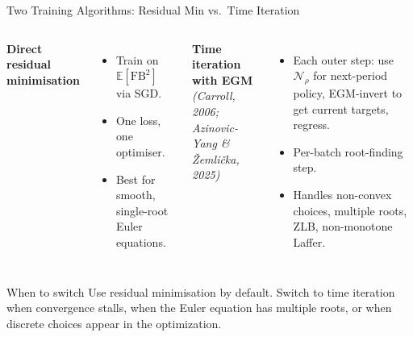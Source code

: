 \documentclass[aspectratio=169,11pt]{beamer}
\newcommand{\emphc}[1]{\textcolor{harvardcrimson}{#1}}
\begin{document}
\begin{frame}{Two Training Algorithms: Residual Min vs.\ Time Iteration}
\small
\begin{columns}[T]
\textbf{Direct residual minimisation}
\begin{itemize}\itemsep2pt
    \item Train on $\mathbb{E}[\mathrm{FB}^2]$ via SGD.
    \item One loss, one optimiser.
    \item Best for smooth, single-root Euler equations.
\end{itemize}

\textbf{Time iteration with EGM}\\[2pt]
{\footnotesize\itshape (Carroll, 2006; Azinovic-Yang \& \v{Z}emli\v{c}ka, 2025)}
\begin{itemize}\itemsep2pt
    \item Each outer step: use $\mathcal{N}_\rho$ for next-period policy, EGM-invert to get current targets, regress.
    \item Per-batch root-finding step.
    \item Handles \emphc{non-convex} choices, \emphc{multiple roots}, ZLB, non-monotone Laffer.
\end{itemize}
\end{columns}

\vspace{0.2em}
\begin{block}{When to switch}
{\footnotesize Use \emphc{residual minimisation} by default.  Switch to \emphc{time iteration} when convergence stalls, when the Euler equation has multiple roots, or when discrete choices appear in the optimization.}
\end{block}
\end{frame}
\end{document}
